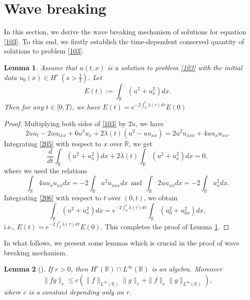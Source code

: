 \documentclass[preprint,12pt]{elsarticle}
\numberwithin{equation}{section}
\newtheorem{lemma}{Lemma}[section]
\begin{document}
\section{Wave breaking}
\setcounter{equation}{0}

\label{sec:3}


In this section, we derive the wave breaking mechanism of solutions for equation \eqref{103}. To this end, we firstly establish the time-dependent conserved quantity of solutions to problem \eqref{103}.

\begin{lemma}
\label{lem201}  Assume that $u(t,x)$ is a solution to problem \eqref{103} with the initial data $u_{0}(x)\in H^{s}\ (s>\frac{3}{2})$.
Let $$E(t):=\int_{\mathbb{R}}(u^{2}+u_{x}^{2})dx.$$
Then for any $t\in[0,T)$, we have
$E(t)=e^{-2\int_{0}^{t}\lambda(\tau)d\tau} E(0)$
\end{lemma}
\begin{proof}
Multiplying both sides of \eqref{103} by $2u$, we have
\begin{equation}
2uu_{t}-2uu_{txx}+6u^{3}u_{x}+2\lambda(t)(u^{2}-uu_{xx})=2u^{2}u_{xxx}+4uu_{x}u_{xx}.
\label{205}
\end{equation}
Integrating \eqref{205} with respect to $x$ over $\mathbb{R}$, we get
\begin{equation}
\frac{d}{dt}\int_{\mathbb{R}}(u^{2}+u_{x}^{2})dx+2\lambda(t) \int_{\mathbb{R}}(u^{2}+u_{x}^{2})dx=0,
\label{206}
\end{equation}
where we used the relations
\begin{equation*}
\int_{\mathbb{R}}4uu_{x}u_{xx}dx=-2\int_{\mathbb{R}}u^{2}u_{xxx}dx
\ \ \text{and}\ \
\int_{\mathbb{R}}2 uu_{xx}dx=-2\int_{\mathbb{R}}u_{x}^{2}dx.
\end{equation*}
Integrating \eqref{206} with respect to $t$ over $(0,t)$, we obtain
\begin{equation}
\int_{\mathbb{R}}(u^{2}+u_{x}^{2})dx=e^{-2\int_{0}^{t}\lambda(\tau)d\tau} \int_{\mathbb{R}}(u_{0}^{2}+u_{0x}^{2})dx,
\label{207}
\end{equation}
i.e.,
$E(t)=e^{-2\int_{0}^{t}\lambda(\tau)d\tau} E(0)$.
This completes the proof of Lemma \ref{lem201}.
\end{proof}



In what follows, we present some lemmas which is crucial in the proof of wave breaking mechanism.

\begin{lemma}[\cite{Kato1988}]
\label{lem202}
If  $r>0$, then  $H^{r}(\mathbb{R})\cap L^{\infty}(\mathbb{R})$ is an algebra. Moreover
$$\|fg\|_{r}\leq c\left(\|f\|_{L^{\infty}(\mathbb{R})}\|g\|_{r}+\|f\|_{r}\|g\|_{L^{\infty}(\mathbb{R})}\right),$$
where $c$ is a constant depending only on $r$.
\end{lemma}
\end{document}
